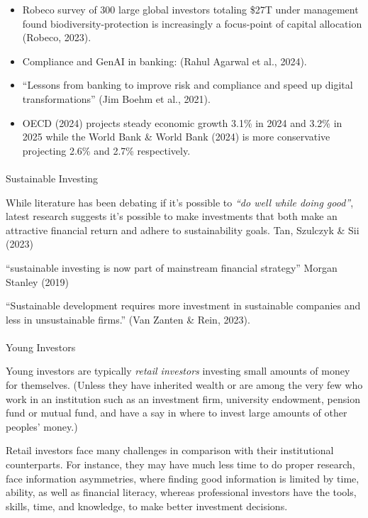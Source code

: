\documentclass[
  letterpaper,
  DIV=11,
  numbers=noendperiod]{scrartcl}
\makeatletter
\let\oldparagraph\paragraph
\renewcommand{\paragraph}{
    \@ifstar
      \xxxParagraphStar
      \xxxParagraphNoStar
  }
\newcommand{\xxxParagraphStar}[1]{\oldparagraph*{#1}\mbox{}}
\newcommand{\xxxParagraphNoStar}[1]{\oldparagraph{#1}\mbox{}}
\makeatother
\begin{document}
\begin{itemize}
\item
  Robeco survey of 300 large global investors totaling \$27T under
  management found biodiversity-protection is increasingly a focus-point
  of capital allocation (Robeco, 2023).
\item
  Compliance and GenAI in banking: (Rahul Agarwal et al., 2024).
\item
  ``Lessons from banking to improve risk and compliance and speed up
  digital transformations'' (Jim Boehm et al., 2021).
\item
  OECD (2024) projects steady economic growth 3.1\% in 2024 and 3.2\% in
  2025 while the World Bank \& World Bank (2024) is more conservative
  projecting 2.6\% and 2.7\% respectively.
\end{itemize}

\paragraph{Sustainable Investing}\label{sustainable-investing}

While literature has been debating if it's possible to \emph{``do well
while doing good''}, latest research suggests it's possible to make
investments that both make an attractive financial return and adhere to
sustainability goals. Tan, Szulczyk \& Sii (2023)

``sustainable investing is now part of mainstream financial strategy''
Morgan Stanley (2019)

``Sustainable development requires more investment in sustainable
companies and less in unsustainable firms.'' (Van Zanten \& Rein, 2023).

\paragraph{Young Investors}\label{young-investors}

Young investors are typically \emph{retail investors} investing small
amounts of money for themselves. (Unless they have inherited wealth or
are among the very few who work in an institution such as an investment
firm, university endowment, pension fund or mutual fund, and have a say
in where to invest large amounts of other peoples' money.)

Retail investors face many challenges in comparison with their
institutional counterparts. For instance, they may have much less time
to do proper research, face information asymmetries, where finding good
information is limited by time, ability, as well as financial literacy,
whereas professional investors have the tools, skills, time, and
knowledge, to make better investment decisions.
\end{document}
